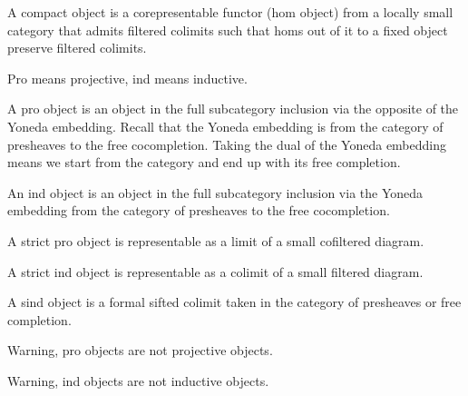 \begin{definition}
    \label{definition-compact-object}
    A compact object is a corepresentable functor (hom object) from a locally small category that admits filtered colimits such that homs out of it to a fixed object preserve filtered colimits.
\end{definition}

Pro means projective, ind means inductive.

\begin{definition}
    \label{definition-pro-object}
    A pro object is an object in the full subcategory inclusion via the opposite of the Yoneda embedding. Recall that the Yoneda embedding is from the category of presheaves to the free cocompletion. Taking the dual of the Yoneda embedding means we start from the category and end up with its free completion.
\end{definition}

\begin{definition}
    \label{definition-ind-object}
    An ind object is an object in the full subcategory inclusion via the Yoneda embedding from the category of presheaves to the free cocompletion.
\end{definition}

\begin{definition}
    \label{definition-strict-pro-object}
    A strict pro object is representable as a limit of a small cofiltered diagram.
\end{definition}

\begin{definition}
    \label{definition-strict-ind-object}
    A strict ind object is representable as a colimit of a small filtered diagram.
\end{definition}

\begin{definition}
    \label{definition-strict-ind-object}
    A sind object is a formal sifted colimit taken in the category of presheaves or free completion.
\end{definition}

\begin{remark}
    Warning, pro objects are not projective objects.

    Warning, ind objects are not inductive objects.
\end{remark}

